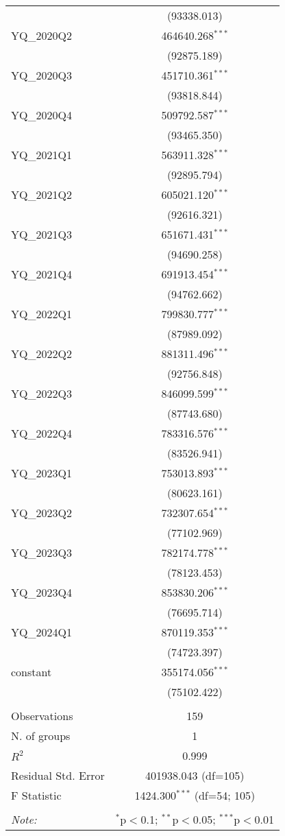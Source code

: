 \begin{table}[!htbp]
\begin{tabular}{@{\extracolsep{5pt}}lc}
& (93338.013) \\
 YQ_2020Q2 & 464640.268$^{***}$ \\
& (92875.189) \\
 YQ_2020Q3 & 451710.361$^{***}$ \\
& (93818.844) \\
 YQ_2020Q4 & 509792.587$^{***}$ \\
& (93465.350) \\
 YQ_2021Q1 & 563911.328$^{***}$ \\
& (92895.794) \\
 YQ_2021Q2 & 605021.120$^{***}$ \\
& (92616.321) \\
 YQ_2021Q3 & 651671.431$^{***}$ \\
& (94690.258) \\
 YQ_2021Q4 & 691913.454$^{***}$ \\
& (94762.662) \\
 YQ_2022Q1 & 799830.777$^{***}$ \\
& (87989.092) \\
 YQ_2022Q2 & 881311.496$^{***}$ \\
& (92756.848) \\
 YQ_2022Q3 & 846099.599$^{***}$ \\
& (87743.680) \\
 YQ_2022Q4 & 783316.576$^{***}$ \\
& (83526.941) \\
 YQ_2023Q1 & 753013.893$^{***}$ \\
& (80623.161) \\
 YQ_2023Q2 & 732307.654$^{***}$ \\
& (77102.969) \\
 YQ_2023Q3 & 782174.778$^{***}$ \\
& (78123.453) \\
 YQ_2023Q4 & 853830.206$^{***}$ \\
& (76695.714) \\
 YQ_2024Q1 & 870119.353$^{***}$ \\
& (74723.397) \\
 constant & 355174.056$^{***}$ \\
& (75102.422) \\
\hline \\[-1.8ex]
 Observations & 159 \\
 N. of groups & 1 \\
 $R^2$ & 0.999 \\
 Residual Std. Error & 401938.043 (df=105) \\
 F Statistic & 1424.300$^{***}$ (df=54; 105) \\
\hline
\hline \\[-1.8ex]
\textit{Note:} & \multicolumn{1}{r}{$^{*}$p$<$0.1; $^{**}$p$<$0.05; $^{***}$p$<$0.01} \\
\end{tabular}
\end{table}